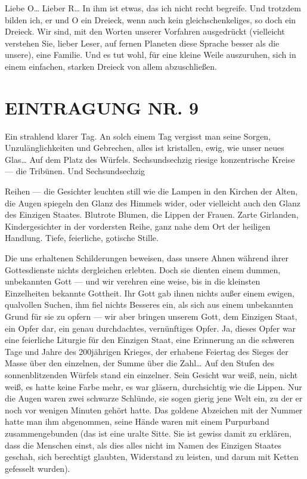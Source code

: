 Liebe O\ldots{} Lieber R\ldots{} In ihm ist etwas, das ich nicht recht
begreife. Und trotzdem bilden ich, er und O ein Dreieck, wenn auch
kein gleichschenkeliges, so doch ein Dreieck. Wir sind, mit den
Worten unserer Vorfahren ausgedrückt (vielleicht verstehen Sie,
lieber Leser, auf fernen Planeten diese Sprache besser als die
unsere), eine Familie. Und es tut wohl, für eine kleine Weile
auszuruhen, sich in einem einfachen, starken Dreieck von allem
abzuschließen.

\section{EINTRAGUNG NR. 9}

Ein strahlend klarer Tag. An solch einem Tag vergisst man seine
Sorgen, Unzulänglichkeiten und Gebrechen, alles ist kristallen,
ewig, wie unser neues Glas\ldots{} Auf dem Platz des Würfels.
Sechsundsechzig riesige konzentrische Kreise — die Tribünen. Und
Sechsundsechzig

Reihen — die Gesichter leuchten still wie die Lampen in den Kirchen
der Alten, die Augen spiegeln den Glanz des Himmels wider, oder
vielleicht auch den Glanz des Einzigen Staates. Blutrote Blumen,
die Lippen der Frauen. Zarte Girlanden, Kindergesichter in der
vordersten Reihe, ganz nahe dem Ort der heiligen Handlung. Tiefe,
feierliche, gotische Stille.

Die uns erhaltenen Schilderungen beweisen, dass unsere Ahnen
während ihrer Gottesdienste nichts dergleichen erlebten. Doch sie
dienten einem dummen, unbekannten Gott — und wir verehren eine
weise, bis in die kleinsten Einzelheiten bekannte Gottheit. Ihr
Gott gab ihnen nichts außer einem ewigen, qualvollen Suchen, ihm
fiel nichts Besseres ein, als sich aus einem unbekannten Grund für
sie zu opfern — wir aber bringen unserem Gott, dem Einzigen Staat,
ein Opfer dar, ein genau durchdachtes, vernünftiges Opfer. Ja,
dieses Opfer war eine feierliche Liturgie für den Einzigen Staat,
eine Erinnerung an die schweren Tage und Jahre des 200jährigen
Krieges, der erhabene Feiertag des Sieges der Masse über den
einzelnen, der Summe über die Zahl\ldots{} Auf den Stufen des
sonnenblitzenden Würfels stand ein einzelner. Sein Gesicht war
weiß, nein, nicht weiß, es hatte keine Farbe mehr, es war gläsern,
durchsichtig wie die Lippen. Nur die Augen waren zwei schwarze
Schlünde, sie sogen gierig jene Welt ein, zu der er noch vor
wenigen Minuten gehört hatte. Das goldene Abzeichen mit der Nummer
hatte man ihm abgenommen, seine Hände waren mit einem Purpurband
zusammengebunden (das ist eine uralte Sitte. Sie ist gewiss damit
zu erklären, dass die Menschen einst, als dies alles nicht im Namen
des Einzigen Staates geschah, sich berechtigt glaubten, Widerstand
zu leisten, und darum mit Ketten gefesselt wurden).

